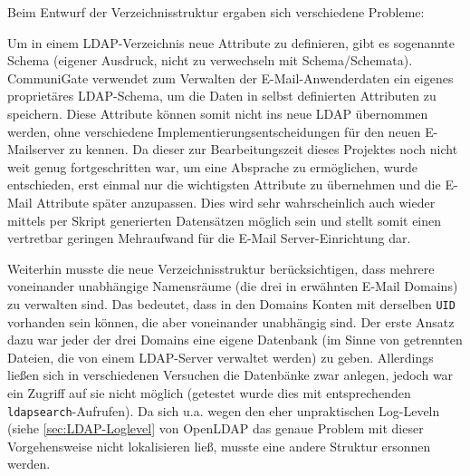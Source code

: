 \documentclass[11pt,a4paper,titlepage=firstiscover,headsepline,bibtotoc]{scrartcl} %
\begin{document}
\medskip Beim Entwurf der Verzeichnisstruktur ergaben sich verschiedene Probleme:

\noindent Um in einem LDAP-Verzeichnis neue Attribute zu definieren, gibt es sogenannte Schema (eigener Ausdruck, nicht zu verwechseln mit Schema/Schemata). CommuniGate verwendet zum Verwalten der E-Mail-Anwenderdaten ein eigenes proprietäres LDAP-Schema, um die Daten in selbst definierten Attributen zu speichern. Diese Attribute können somit nicht ins neue LDAP übernommen werden, ohne verschiedene Implementierungsentscheidungen für den neuen E-Mailserver zu kennen. Da dieser zur Bearbeitungszeit dieses Projektes noch nicht weit genug fortgeschritten war, um eine Absprache zu ermöglichen, wurde entschieden, erst einmal nur die wichtigsten Attribute zu übernehmen und die E-Mail Attribute später anzupassen. Dies wird sehr wahrscheinlich auch wieder mittels per Skript generierten Datensätzen möglich sein und stellt somit einen vertretbar geringen Mehraufwand für die E-Mail Server-Einrichtung dar.

Weiterhin musste die neue Verzeichnisstruktur berücksichtigen, dass mehrere voneinander unabhängige Namensräume (die drei in  erwähnten E-Mail Domains) zu verwalten sind. Das bedeutet, dass in den Domains Konten mit derselben \texttt{UID} vorhanden sein können, die aber voneinander unabhängig sind. Der erste Ansatz dazu war jeder der drei Domains eine eigene Datenbank (im Sinne von getrennten Dateien, die von einem LDAP-Server verwaltet werden) zu geben. Allerdings ließen sich in verschiedenen Versuchen die Datenbänke zwar anlegen, jedoch war ein Zugriff auf sie nicht möglich (getestet wurde dies mit entsprechenden \texttt{ldapsearch}-Aufrufen). Da sich u.a. wegen den eher unpraktischen Log-Leveln (siehe \autoref{sec:LDAP-Loglevel} von OpenLDAP das genaue Problem mit dieser Vorgehensweise nicht lokalisieren ließ, musste eine andere Struktur ersonnen werden.
\end{document}
